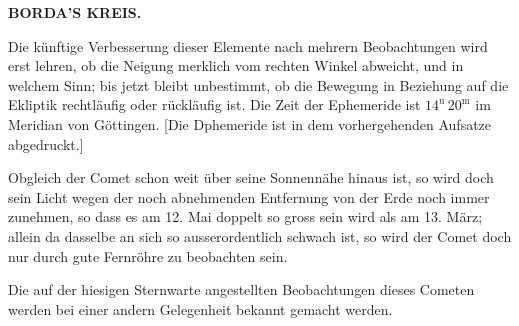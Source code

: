 \clearpage
\thispagestyle{empty}
\noindent{}%
%
\parbox[t]{\dimexpr\linewidth-24mm\relax}{\centering\footnotesize\bfseries BORDA’S KREIS.\par}%
\makebox[12mm][r]{}\par\nobreak\medskip
\par\indent Die künftige Verbesserung dieser Elemente nach mehrern Beobachtungen wird erst lehren, ob
die Neigung merklich vom rechten Winkel abweicht, und in welchem Sinn; bis jetzt bleibt
unbestimmt, ob die Bewegung in Beziehung auf die Ekliptik rechtläufig oder rückläufig ist.
Die Zeit der Ephemeride ist $14^{\mathrm u}\,20^{\mathrm m}$ im Meridian von Göttingen. [Die Dphemeride ist
in dem vorhergehenden Aufsatze abgedruckt.]

\par\indent Obgleich der Comet schon weit über seine Sonnennähe hinaus ist, so wird doch sein Licht
wegen der noch abnehmenden Entfernung von der Erde noch immer zunehmen, so dass es am
12. Mai doppelt so gross sein wird als am 13. März; allein da dasselbe an sich so
ausserordentlich schwach ist, so wird der Comet doch nur durch gute Fernröhre zu beobachten
sein.

\par\indent Die auf der hiesigen Sternwarte angestellten Beobachtungen dieses Cometen werden bei einer
andern Gelegenheit bekannt gemacht werden.
